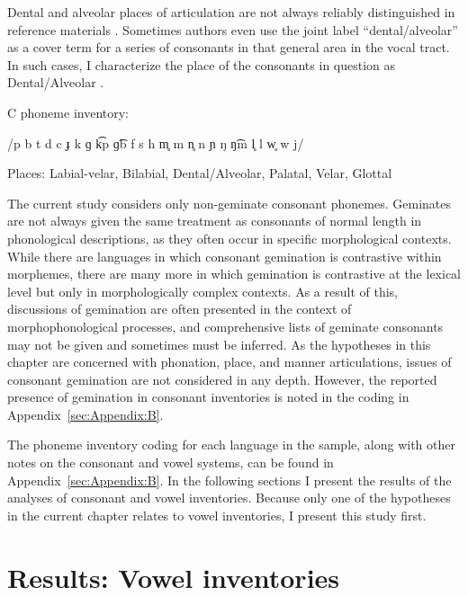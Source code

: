 Dental and alveolar places of articulation are not always reliably distinguished in reference materials \citep[31--32]{Maddieson1984}. Sometimes authors even use the joint label ``dental/alveolar'' as a cover term for a series of consonants in that general area in the vocal tract. In such cases, I characterize the place of the consonants in question as Dental/Alveolar .

\ea\label{ex:4.11}
\begin{Coding}
\item[C phoneme inventory:] \item[] /p b t d c ɟ k ɡ k͡p ɡ͡b f s h m̥ m n̥ n ɲ ŋ ŋ͡m l̥ l w̥ w j/
\item[Places:] Labial-velar, Bilabial, Dental/Alveolar, Palatal, Velar, Glottal
\end{Coding}
\z

  The current study considers only non-geminate consonant phonemes. Geminates are not always given the same treatment as consonants of normal length in phonological descriptions, as they often occur in specific morphological contexts. While there are languages in which consonant gemination is contrastive within morphemes, there are many more in which gemination is contrastive at the lexical level but only in morphologically complex contexts. As a result of this, discussions of gemination are often presented in the context of morphophonological processes, and comprehensive lists of geminate consonants may not be given and sometimes must be inferred. As the hypotheses in this chapter are concerned with phonation, place, and manner articulations, issues of consonant gemination are not considered in any depth. However, the reported presence of gemination in consonant inventories is noted in the coding in Appendix~\ref{sec:Appendix:B}.

  The phoneme inventory coding for each language in the sample, along with other notes on the consonant and vowel systems, can be found in Appendix~\ref{sec:Appendix:B}. In the following sections I present the results of the analyses of consonant and vowel inventories. Because only one of the hypotheses in the current chapter relates to vowel inventories, I present this study first.

\section{Results: Vowel inventories}\label{sec:4.3}

